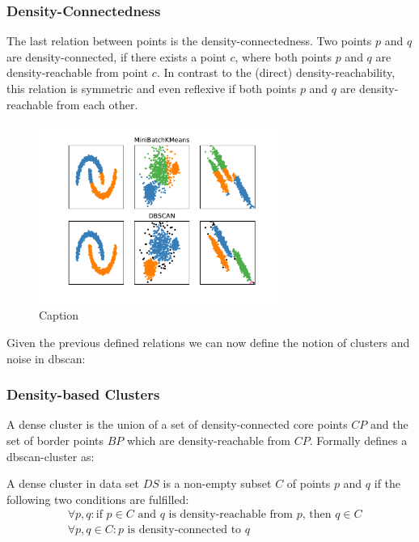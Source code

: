 \subsubsection*{Density-Connectedness}
The last relation between points is the density-connectedness. Two points $p$ and $q$ are density-connected, if there exists a point $c$, where both points $p$ and $q$ are density-reachable from point $c$. In contrast to the (direct) density-reachability, this relation is symmetric and even reflexive if both points $p$ and $q$ are density-reachable from each other. 
\begin{figure}
    \centering
    \includegraphics[width=0.7\textwidth]{figures/KMeansVSDBSCAN.pdf}
    \caption{Caption}
    \label{fig:kmeansdbscan}
\end{figure}

\vspace{5mm}

Given the previous defined relations we can now define the notion of clusters and noise in \gls{dbscan}:

\subsubsection*{Density-based Clusters}
A dense cluster is the union of a set of density-connected core points $CP$ and the set of border points $BP$ which are density-reachable from $CP$.
Formally \citeauthor{DBSCANEKSX96} defines a \gls{dbscan}-cluster as:

A dense cluster in data set $DS$ is a non-empty subset $C$ of points $p$ and $q$ if the following two conditions are fulfilled:
\begin{align}
    &\forall p, q: \text{if } p \in C \text{ and } q \text{ is density-reachable from } p \text{, then } q \in C \\
    &\forall p, q \in C: p \text{ is density-connected to }q
\end{align}

